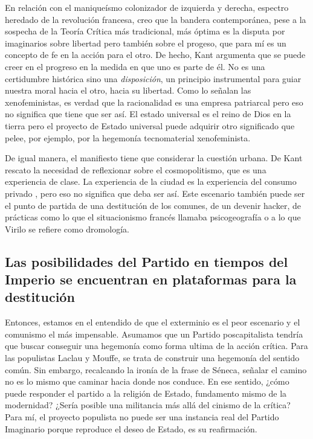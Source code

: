 En relación con el maniqueísmo colonizador de izquierda y derecha, espectro heredado de la revolución francesa, creo que la bandera contemporánea, pese a la sospecha de la Teoría Crítica más tradicional, más óptima es la disputa por imaginarios sobre libertad pero también sobre el progeso, que para mí es un concepto de fe en la acción para el otro. De hecho, Kant argumenta que se puede creer en el progreso en la medida en que uno es parte de él. No es una certidumbre histórica sino una \emph{disposición}, un principio instrumental para guiar nuestra moral hacia el otro, hacia su libertad. Como lo señalan las xenofeministas, es verdad que la racionalidad es una empresa patriarcal pero eso no significa que tiene que ser así. El estado universal es el reino de Dios en la tierra pero el proyecto de Estado universal puede adquirir otro significado que pelee, por ejemplo, por la hegemonía tecnomaterial xenofeminista.

De igual manera, el manifiesto tiene que considerar la cuestión urbana. De Kant rescato la necesidad de reflexionar sobre el cosmopolitismo, que es una experiencia de clase. La experiencia de la ciudad es la experiencia del consumo privado \autocite{consejonocturnoHabitarMasFuerte2018}, pero eso no significa que deba ser así. Este escenario también puede ser el punto de partida de una destitución de los comunes, de un devenir hacker, de prácticas como lo que el situacionismo francés llamaba psicogeografía o a lo que Virilo se refiere como dromología.

\subsection{Las posibilidades del Partido en tiempos del Imperio se encuentran en plataformas para la destitución}
\label{sub:las-posibilidades-del-partido}

Entonces, estamos en el entendido de que el exterminio es el peor escenario y el comunismo el más impensable. Asumamos que un Partido poscapitalista tendría que buscar conseguir una hegemonía como forma ultima de la acción crítica. Para las populistas Laclau y Mouffe, se trata de construir una hegemonía del sentido común. Sin embargo, recalcando la ironía de la frase de Séneca, señalar el camino no es lo mismo que caminar hacia donde nos conduce. En ese sentido, ¿cómo puede responder el partido a la religión de Estado, fundamento mismo de la modernidad? ¿Sería posible una militancia más allá del cinismo de la crítica? Para mí, el proyecto populista no puede ser una instancia real del Partido Imaginario porque reproduce el deseo de Estado, es su reafirmación.

